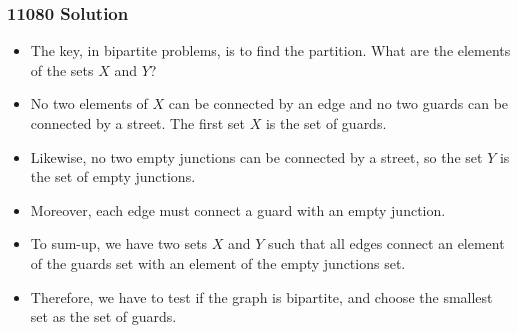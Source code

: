 \documentclass{beamer}
\newcommand{\uvalink}[2]{UVa Online Judge (http://uva.onlinejudge.org)
  problem number \href{#2}{\textcolor{blue}{#1}.}}
\newcounter{exo}
\newcommand{\exo}{
  \addtocounter{exo}{1}
  Exercice \arabic{exo}
}
\begin{document}
\fi


\ifanswers

\begin{frame}
\frametitle{11080 Solution}

\scriptsize

\begin{itemize}

\item The key, in bipartite problems, is to find the partition. What are the elements of the sets $X$ and $Y$?

\item<2-> No two elements of $X$ can be connected by an edge and no two guards can be connected by a street. The first
set $X$ is the set of guards.

\item<3-> Likewise, no two empty junctions can be connected by a street, so the set $Y$ is the set of empty junctions.

\item<4-> Moreover, each edge must connect a guard with an empty junction.

\item<5-> To sum-up, we have two sets $X$ and $Y$ such that all edges connect an element of the guards set with an element of the empty junctions set.

\item<6-> Therefore, we have to test if the graph is bipartite, and choose the smallest set as the set of guards.


\end{itemize}

\end{frame}
\end{document}
